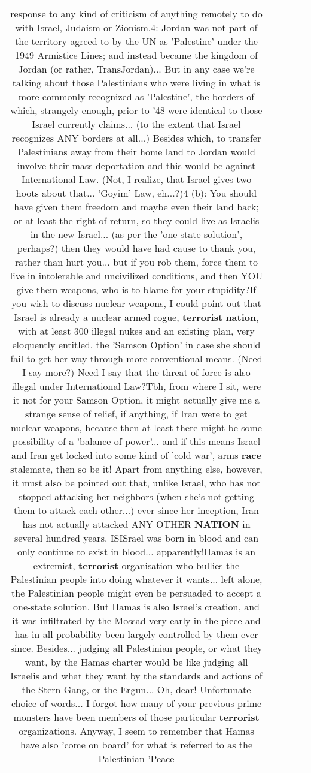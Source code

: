 \documentclass[11pt]{article}
\newlength\mylength
\begin{document}
\begin{center}
\begin{longtable}{|C{.65\mylength}|C{.30\mylength}|C{.12\mylength}|C{.12\mylength}|C{.12\mylength}|}
response to any kind of criticism of anything remotely to do with Israel, Judaism or Zionism.4: Jordan was not part of the territory agreed to by the UN as 'Palestine' under the 1949 Armistice Lines; and instead became the kingdom of Jordan (or rather, TransJordan)... But in any case we're talking about those Palestinians who were living in what is more commonly recognized as 'Palestine', the borders of which, strangely enough, prior to '48 were identical to those Israel currently claims... (to the extent that Israel recognizes ANY borders at all...) Besides which, to transfer Palestinians away from their home land to Jordan would involve their mass deportation and this would be against International Law. (Not, I realize, that Israel gives two hoots about that... 'Goyim' Law, eh...?)4 (b): You should have given them freedom and maybe even their land back; or at least the right of return, so they could live as Israelis in the new Israel... (as per the 'one-state solution', perhaps?) then they would have had cause to thank you, rather than hurt you... but if you rob them, force them to live in intolerable and uncivilized conditions, and then YOU give them weapons, who is to blame for your stupidity?If you wish to discuss nuclear weapons, I could point out that Israel is already a nuclear armed rogue, \textbf{terrorist} \textbf{nation}, with at least 300 illegal nukes and an existing plan, very eloquently entitled, the 'Samson Option' in case she should fail to get her way through more conventional means. (Need I say more?) Need I say that the threat of force is also illegal under International Law?Tbh, from where I sit, were it not for your Samson Option, it might actually give me a strange sense of relief, if anything, if Iran were to get nuclear weapons, because then at least there might be some possibility of a 'balance of power'... and if this means Israel and Iran get locked into some kind of 'cold war', arms \textbf{race} stalemate, then so be it! Apart from anything else, however, it must also be pointed out that, unlike Israel, who has not stopped attacking her neighbors (when she's not getting them to attack each other...) ever since her inception, Iran has not actually attacked ANY OTHER \textbf{NATION} in several hundred years. ISISrael was born in blood and can only continue to exist in blood... apparently!Hamas is an extremist, \textbf{terrorist} organisation who bullies the Palestinian people into doing whatever it wants... left alone, the Palestinian people might even be persuaded to accept a one-state solution. But Hamas is also Israel's creation, and it was infiltrated by the Mossad very early in the piece and has in all probability been largely controlled by them ever since. Besides... judging all Palestinian people, or what they want, by the Hamas charter would be like judging all Israelis and what they want by the standards and actions of the Stern Gang, or the Ergun... Oh, dear! Unfortunate choice of words... I forgot how many of your previous prime monsters have been members of those particular \textbf{terrorist} organizations. Anyway, I seem to remember that Hamas have also 'come on board' for what is referred to as the Palestinian 'Peace 
\end{longtable}
\end{center}
\end{document}
